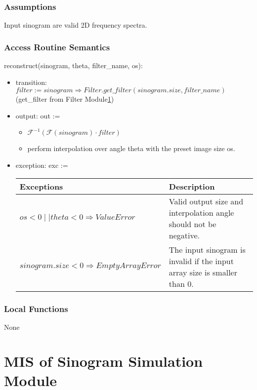 \documentclass[12pt, titlepage]{article}
\begin{document}
\subsubsection{Assumptions}
Input sinogram are valid 2D frequency spectra.

\subsubsection{Access Routine Semantics}

\noindent reconstruct(sinogram, theta, filter\_name, os):
\begin{itemize}
\item transition: \(filter := sinogram \Rightarrow Filter.get\_filter(sinogram.size,
  filter\_name)\) (get\_filter from Filter Module\ref{Module})
\item output: out :=
  \begin{itemize}
    \item \(\mathcal{F}^{-1}(\mathcal{F}(sinogram)\cdot filter)\)
    \item perform interpolation over angle theta with the preset image size os.
  \end{itemize}
  \item exception: exc :=
    \begin{center}
      \begin{tabular}{|m{15em}|m{15em}|}
        \hline
        \textbf{Exceptions} & \textbf{Description} \\
        \hline
        \(os < 0 \mid\mid theta < 0 \Rightarrow ValueError\) & Valid output size and interpolation angle should not be negative. \\
        \hline
        \(sinogram.size < 0 \Rightarrow EmptyArrayError\) & The input sinogram is invalid if the input array size is smaller than 0.\\
        \hline
      \end{tabular}
    \end{center}
\end{itemize}


\subsubsection{Local Functions}
None

\newpage
\section{MIS of Sinogram Simulation Module} \label{Module}
\end{document}
